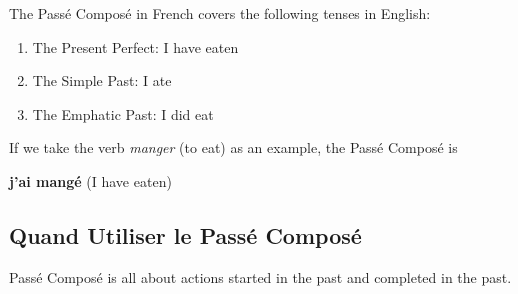 \documentclass{book}
\begin{document}
The Passé Composé in French covers the following tenses in English:
\begin{enumerate}
    \item The Present Perfect: I have eaten
    \item The Simple Past: I ate
    \item The Emphatic Past: I did eat
\end{enumerate}
If we take the verb \textit{manger} (to eat) as an example, the Passé Composé is 
\begin{center}
\textbf{j'ai mangé} (I have eaten)
\end{center}

\subsection{Quand Utiliser le Passé Composé}
Passé Composé is all about actions started in the past and completed in the past. 
\end{document}

